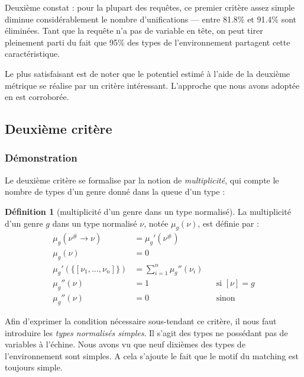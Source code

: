 \documentclass[a4paper]{report}
\theoremstyle{definition}
\newtheorem{definition}[theoreme]{Définition}
\newcommand{\mset}[1]{\{\![#1]\!\}}
\begin{document}
{Deuxième constat : pour la plupart des requêtes, ce premier critère assez simple diminue considérablement le nombre d'unifications — entre 81.8\% et 91.4\% sont éliminées. Tant que la requête n'a pas de variable en tête, on peut tirer pleinement parti du fait que 95\% des types de l'environnement partagent cette caractéristique.

Le plus satisfaisant est de noter que le potentiel estimé à l'aide de la deuxième métrique se réalise par un critère intéressant. L'approche que nous avons adoptée en est corroborée.


\subsection{Deuxième critère}

\subsubsection{Démonstration}

Le deuxième critère se formalise par la notion de \emph{multiplicité}, qui compte le nombre de types d'un genre donné dans la queue d'un type :

\begin{definition}[multiplicité d'un genre dans un type normalisé]
  La multiplicité d'un genre $g$ dans un type normalisé $\nu$, notée $\mu_g (\nu)$, est définie par :
  \begin{align*}
      \mu_g (\nu^\# \rightarrow \nu) &=
      \mu_g' (\nu^\#)
    \\
      \mu_g (\nu) &=
      0
    \\
      \mu_g' (\mset{\nu_1, \dots, \nu_n}) &=
      \sum_{i=1}^n \mu_g'' (\nu_i)
    \\
      \mu_g'' (\nu) &=
      1 &&
      \text{si } [\nu] = g
    \\
      \mu_g'' (\nu) &=
      0 &&
      \text{sinon}
  \end{align*}
\end{definition}

Afin d'exprimer la condition nécessaire sous-tendant ce critère, il nous faut introduire les \emph{types normalisés simples}. Il s'agit des types ne possédant pas de variables à l'échine. Nous avons vu que neuf dixièmes des types de l'environnement sont simples. A cela s'ajoute le fait que le motif du matching est toujours simple.

}
\end{document}
